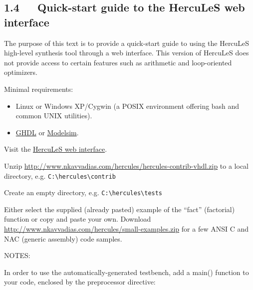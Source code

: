 \documentclass[a4paper]{article}
\begin{document}
\subsection{1.4~~~Quick-start guide to the HercuLeS web interface%
  \label{quick-start-guide-to-the-hercules-web-interface}%
}

The purpose of this text is to provide a quick-start guide to using the HercuLeS
high-level synthesis tool through a web interface.
This version of HercuLeS does not provide access to certain features such as
arithmetic and loop-oriented optimizers.

Minimal requirements:
%
\begin{itemize}

\item Linux or Windows XP/Cygwin (a POSIX environment offering bash and common UNIX
utilities).

\item \href{http://ghdl.free.fr}{GHDL} or \href{http://www.model.com}{Modelsim}.

\end{itemize}
\begin{list}{.}
{
\addtocounter{listcnt0}{-1}
\setlength{\rightmargin}{\leftmargin}
}

\item Visit the \href{http://www.nkavvadias.com/cgi-bin/herc.cgi}{HercuLeS web interface}.

\item Unzip \url{http://www.nkavvadias.com/hercules/hercules-contrib-vhdl.zip} to a local
directory, e.g. \texttt{C:\textbackslash{}hercules\textbackslash{}contrib}

\item Create an empty directory, e.g. \texttt{C:\textbackslash{}hercules\textbackslash{}tests}

\item Either select the supplied (already pasted) example of the ``fact'' (factorial)
function or copy and paste your own. Download \url{http://www.nkavvadias.com/hercules/small-examples.zip}
for a few ANSI C and NAC (generic assembly) code samples.

NOTES:
\begin{list}{.}
{
\setlength{\rightmargin}{\leftmargin}
}

\item In order to use the automatically-generated testbench, add a main() function
to your code, enclosed by the preprocessor directive:
\end{list}
\end{list}
\end{document}
